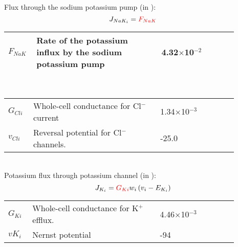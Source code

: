 \documentclass[fleqn]{report}
\numberwithin{equation}{section}
\numberwithin{equation}{section}
\begin{document}
	Flux through the sodium potassium pump (in \uMs): 
	\begin{equation} \label{eq:J_NaK_i}
	J_{NaK_{i}}= \textcolor{red}{F_{NaK}}
	\end{equation}
	\begin{table}[h!]
	\centering
	\begin{tabular}{ p{0.09\linewidth}  >{\footnotesize} p{0.5\linewidth}  >{\footnotesize} p{0.27\linewidth} >{\footnotesize} p{0.03\linewidth} }
	\hline
	$F_{NaK}$      			& Rate of the potassium influx by the sodium potassium pump 		& 4.32$\times$10$^{-2}$ \uMps 	&\cite{Koenigsberger2006} \\
	\hline
	\end{tabular}
	\label{tab:JCli}
	\end{table}
	\\
	\begin{table}[h!]
	\centering
	\begin{tabular}{ p{0.09\linewidth}  >{\footnotesize} p{0.5\linewidth}  >{\footnotesize} p{0.27\linewidth} >{\footnotesize} p{0.03\linewidth} }
	\hline
	$G_{Cli}$      			& Whole-cell conductance for Cl$^{-}$ current		& 1.34$\times$10$^{-3}$ \uMpmVs	&\cite{Koenigsberger2006} \\
	$v_{Cli}$      			& Reversal potential for Cl$^{-}$ channels.			& -25.0 \mV			&\cite{Koenigsberger2006} \\
	\hline
	\end{tabular}
	\label{tab:JCli}
	\end{table}
	\\
	Potassium flux through potassium channel (in \uMs):
	\begin{equation} \label{eq:JKi}
	J_{K_{i}}= \textcolor{red}{G_{Ki}} w_{i} \left(  v_{i} - E_{K_{i} } \right) 
	\end{equation}
	\begin{table}[h!]
	\centering
	\begin{tabular}{ p{0.09\linewidth}  >{\footnotesize} p{0.5\linewidth}  >{\footnotesize} p{0.27\linewidth} >{\footnotesize} p{0.03\linewidth} }
	\hline
	$G_{Ki}$      			& Whole-cell conductance for K$^{+}$ efflux.			& 4.46$\times$10$^{-3}$ \uMpmVs	&\cite{Koenigsberger2006} \\
	$vK_i$      			& Nernst potential										& -94 \mV	&\cite{Koenigsberger2006} \\
	\hline
	\end{tabular}
	\label{tab:JKi}
	\end{table}
\end{document}

